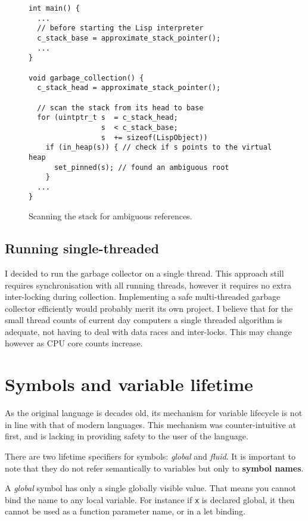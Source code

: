 \begin{figure}
\begin{verbatim}
int main() {
  ...
  // before starting the Lisp interpreter
  c_stack_base = approximate_stack_pointer();
  ...
}

void garbage_collection() {
  c_stack_head = approximate_stack_pointer();

  // scan the stack from its head to base
  for (uintptr_t s  = c_stack_head;
                 s  < c_stack_base;
                 s  += sizeof(LispObject))
    if (in_heap(s)) { // check if s points to the virtual heap
      set_pinned(s); // found an ambiguous root
    }
  ...
}
\end{verbatim}
\caption{Scanning the stack for ambiguous references.}
\label{fig:scanpinned}
\end{figure}

\subsection{Running single-threaded}

I decided to run the garbage collector on a single thread. This approach still requires synchronisation with all running
threads, however it requires no extra inter-locking during collection. Implementing a safe multi-threaded garbage collector
efficiently would probably merit its own project. I believe that for the small thread counts of current day computers
a single threaded algorithm is adequate, not having to deal with data races and inter-locks. This may change however as
CPU core counts increase.

\section{Symbols and variable lifetime}
As the original language is decades old, its mechanism for variable lifecycle is not in line with that of modern languages.
This mechanism was counter-intuitive at first, and is lacking in providing safety to the user of the language.

There are two lifetime specifiers for symbols: \emph{global} and \emph{fluid}. It is important to note that they
do not refer semantically to variables but only to \textbf{symbol names}.

A \emph{global} symbol has only a single globally visible value. That means you cannot bind the name to any local
variable. For instance if \texttt{x} is declared global, it then cannot be used as a function parameter name, or in a
let binding.

